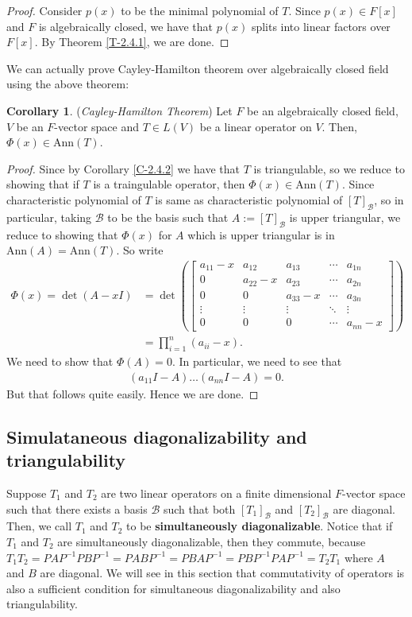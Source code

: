 \documentclass[letterpaper,11pt,twoside]{article}
\theoremstyle{definition}
\theoremstyle{definition}
\theoremstyle{definition}
\theoremstyle{definition}
\theoremstyle{definition}
\theoremstyle{definition}
\theoremstyle{remark}
\theoremstyle{definition}
\newtheorem{corollary}[proposition]{Corollary}
\newcommand{\Ann}[1]{\text{Ann}\left(#1\right)}
\begin{document}
    \begin{proof}
    Consider $p(x)$ to be the minimal polynomial of $T$. Since $p(x)\in F[x]$ and $F$ is algebraically closed, we have that $p(x)$ splits into linear factors over $F[x]$. By Theorem \ref{T-2.4.1}, we are done.
    \end{proof}
    We can actually prove Cayley-Hamilton theorem over algebraically closed field using the above theorem:
    \begin{corollary}
    (\textit{Cayley-Hamilton Theorem}) Let $F$ be an algebraically closed field, $V$ be an $F$-vector space and $T\in L(V)$ be a linear operator on $V$. Then, $\Phi(x) \in \Ann{T}$.
    \end{corollary}
    \begin{proof}
    Since by Corollary \ref{C-2.4.2} we have that $T$ is triangulable, so we reduce to showing that if $T$ is a traingulable operator, then $\Phi(x) \in \Ann{T}$. Since characteristic polynomial of $T$ is same as characteristic polynomial of $[T]_\mathcal{B}$, so in particular, taking $\mathcal{B}$ to be the basis such that $A:=[T]_\mathcal{B}$ is upper triangular, we reduce to showing that $\Phi(x)$ for $A$ which is upper triangular is in $\Ann{A} = \Ann{T}$. So write 
    \begin{align*}
         \Phi(x) =\det(A-xI) &= \det\left(\begin{bmatrix}
            a_{11}-x &a_{12} & a_{13} &\cdots &a_{1n}\\
            0&a_{22}-x &a_{23} &\cdots &a_{2n}\\
            0&0&a_{33}-x&\cdots &a_{3n}\\
            \vdots &\vdots &\vdots &\ddots &\vdots\\
            0 &0 &0 &\cdots &a_{nn}-x
            \end{bmatrix}\right)&\\
            &=\prod_{i=1}^n (a_{ii}-x).
    \end{align*}
    We need to show that $\Phi(A) = 0$. In particular, we need to see that
    \begin{align*}
       (a_{11}I-A) \dots (a_{nn}I-A) = 0. 
    \end{align*}
    But that follows quite easily. Hence we are done.
    \end{proof}
    \subsection{Simulataneous diagonalizability and triangulability}
    Suppose $T_1$ and $T_2$ are two linear operators on a finite dimensional $F$-vector space such that there exists a basis $\mathcal{B}$ such that both $[T_1]_\mathcal{B}$
 and $[T_2]_\mathcal{B}$ are diagonal. Then, we call $T_1$ and $T_2$ to be \textbf{simultaneously diagonalizable}. Notice that if $T_1$ and $T_2$ are simultaneously diagonalizable, then they commute, because $T_1T_2 = PAP^{-1}PBP^{-1} = PABP^{-1} = PBAP^{-1} = PBP^{-1}PAP^{-1} = T_2 T_1$ where $A$ and $B$ are diagonal. We will see in this section that commutativity of operators is also a sufficient condition for simultaneous diagonalizability and also triangulability.\\
 
\end{document}
